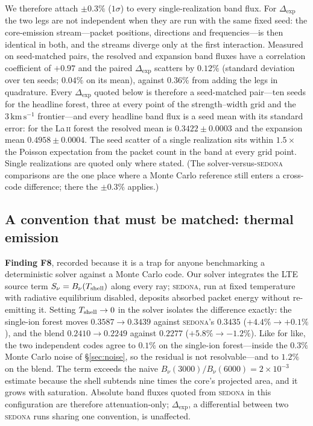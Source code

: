 \documentclass[fleqn,usenatbib]{mnras}
\newcommand{\dexp}{\Delta_{\mathrm{exp}}}
\newcommand{\kms}{\,\mathrm{km\,s^{-1}}}
\begin{document}
We therefore attach $\pm0.3\%$ ($1\sigma$) to every single-realization band
flux. For $\dexp$ the two legs are not independent when they are run with the
same fixed seed: the core-emission stream---packet positions, directions and
frequencies---is then identical in both, and the streams diverge only at the
first interaction. Measured on seed-matched pairs, the resolved and expansion
band fluxes have a correlation coefficient of $+0.97$ and the paired $\dexp$
scatters by $0.12\%$ (standard deviation over ten seeds; $0.04\%$ on its
mean), against $0.36\%$ from adding the legs in quadrature. Every $\dexp$
quoted below is therefore a seed-matched pair---ten seeds for the headline
forest, three at every point of the strength--width grid and the $3\kms$
frontier---and every headline band flux is a seed mean with its standard
error: for the La\,\textsc{ii} forest the resolved mean is $0.3422\pm0.0003$
and the expansion mean $0.4958\pm0.0004$. The seed scatter of a single
realization sits within $1.5\times$ the Poisson expectation from the packet
count in the band at every grid point. Single realizations are quoted only
where stated. (The solver-versus-\textsc{sedona} comparisons are
the one place where a Monte Carlo reference still enters a cross-code
difference; there the $\pm0.3\%$ applies.)

\subsection{A convention that must be matched: thermal emission}
\label{sec:conventions-f8}

\textbf{Finding F8}, recorded because it is a trap for anyone benchmarking a
deterministic solver against a Monte Carlo code. Our solver integrates the
LTE source term $S_\nu = B_\nu(T_{\rm shell})$ along every ray;
\textsc{sedona}, run at fixed temperature with radiative equilibrium
disabled, deposits absorbed packet energy without re-emitting it. Setting
$T_{\rm shell}\to0$ in the solver isolates the difference exactly: the
single-ion forest moves $0.3587 \to 0.3439$ against \textsc{sedona}'s
$0.3435$ ($+4.4\% \to +0.1\%$), and the blend $0.2410 \to 0.2249$ against
$0.2277$ ($+5.8\% \to -1.2\%$). Like for like, the two independent codes
agree to $0.1\%$ on the single-ion forest---inside the $0.3\%$ Monte Carlo
noise of \S\ref{sec:noise}, so the residual is not resolvable---and to
$1.2\%$ on the blend. The term exceeds the naive
$B_\nu(3000)/B_\nu(6000) = 2\times10^{-3}$ estimate because the shell
subtends nine times the core's projected area, and it grows with saturation.
Absolute band fluxes quoted from \textsc{sedona} in this configuration are
therefore attenuation-only; $\dexp$, a differential between two
\textsc{sedona} runs sharing one convention, is unaffected.
\end{document}
